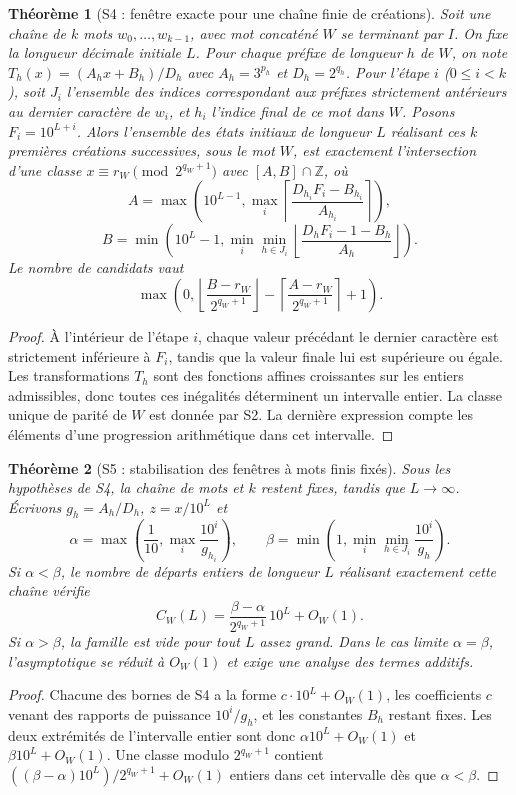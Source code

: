 \documentclass[11pt,a4paper]{article}
\newtheorem{theorem}{Théorème}
\begin{document}
\begin{theorem}[S4 : fenêtre exacte pour une chaîne finie de créations]
Soit une chaîne de $k$ mots $w_0,\ldots,w_{k-1}$, avec mot concaténé $W$ se terminant par $I$. On fixe la longueur décimale initiale $L$. Pour chaque préfixe de longueur $h$ de $W$, on note $T_h(x)=(A_hx+B_h)/D_h$ avec $A_h=3^{p_h}$ et $D_h=2^{q_h}$. Pour l'étape $i$ ($0\le i<k$), soit $J_i$ l'ensemble des indices correspondant aux préfixes strictement antérieurs au dernier caractère de $w_i$, et $h_i$ l'indice final de ce mot dans $W$. Posons $F_i=10^{L+i}$. Alors l'ensemble des états initiaux de longueur $L$ réalisant ces $k$ premières créations successives, sous le mot $W$, est exactement l'intersection d'une classe $x\equiv r_W\pmod{2^{q_W+1}}$ avec $[A,B]\cap\mathbb Z$, où
\[
 A=\max\left(10^{L-1},\max_i\left\lceil\frac{D_{h_i}F_i-B_{h_i}}{A_{h_i}}\right\rceil\right),
\]
\[
 B=\min\left(10^L-1,\min_i\min_{h\in J_i}\left\lfloor\frac{D_hF_i-1-B_h}{A_h}\right\rfloor\right).
\]
Le nombre de candidats vaut
\[
\max\left(0,\left\lfloor\frac{B-r_W}{2^{q_W+1}}\right\rfloor-\left\lceil\frac{A-r_W}{2^{q_W+1}}\right\rceil+1\right).
\]
\end{theorem}
\begin{proof}À l'intérieur de l'étape $i$, chaque valeur précédant le dernier caractère est strictement inférieure à $F_i$, tandis que la valeur finale lui est supérieure ou égale. Les transformations $T_h$ sont des fonctions affines croissantes sur les entiers admissibles, donc toutes ces inégalités déterminent un intervalle entier. La classe unique de parité de $W$ est donnée par S2. La dernière expression compte les éléments d'une progression arithmétique dans cet intervalle.\end{proof}
\begin{theorem}[S5 : stabilisation des fenêtres à mots finis fixés]
Sous les hypothèses de S4, la chaîne de mots et $k$ restent fixes, tandis que $L\to\infty$. Écrivons $g_h=A_h/D_h$, $z=x/10^L$ et
\[
\alpha=\max\left(\frac1{10},\max_i\frac{10^i}{g_{h_i}}\right),\qquad
\beta=\min\left(1,\min_i\min_{h\in J_i}\frac{10^i}{g_h}\right).
\]
Si $\alpha<\beta$, le nombre de départs entiers de longueur $L$ réalisant exactement cette chaîne vérifie
\[
C_W(L)=\frac{\beta-\alpha}{2^{q_W+1}}\,10^L+O_W(1).
\]
Si $\alpha>\beta$, la famille est vide pour tout $L$ assez grand. Dans le cas limite $\alpha=\beta$, l'asymptotique se réduit à $O_W(1)$ et exige une analyse des termes additifs.
\end{theorem}
\begin{proof}Chacune des bornes de S4 a la forme $c\cdot10^L+O_W(1)$, les coefficients $c$ venant des rapports de puissance $10^i/g_h$, et les constantes $B_h$ restant fixes. Les deux extrémités de l'intervalle entier sont donc $\alpha 10^L+O_W(1)$ et $\beta 10^L+O_W(1)$. Une classe modulo $2^{q_W+1}$ contient $((\beta-\alpha)10^L)/2^{q_W+1}+O_W(1)$ entiers dans cet intervalle dès que $\alpha<\beta$.\end{proof}
\end{document}
